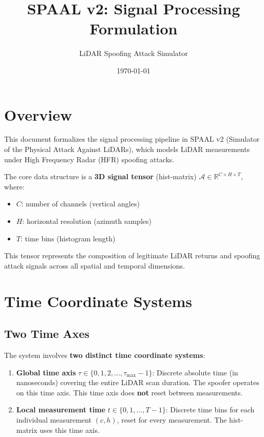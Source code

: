 \documentclass[11pt]{article}
\title{SPAAL v2: Signal Processing Formulation}
\author{LiDAR Spoofing Attack Simulator}
\date{\today}
\begin{document}
\maketitle

\section{Overview}

This document formalizes the signal processing pipeline in SPAAL v2 (Simulator of the Physical Attack Against LiDARs), which models LiDAR measurements under High Frequency Radar (HFR) spoofing attacks.

The core data structure is a \textbf{3D signal tensor} (hist-matrix) $\bm{\mathcal{A}} \in \mathbb{R}^{C \times H \times T}$, where:
\begin{itemize}
    \item $C$: number of channels (vertical angles)
    \item $H$: horizontal resolution (azimuth samples)
    \item $T$: time bins (histogram length)
\end{itemize}

This tensor represents the composition of legitimate LiDAR returns and spoofing attack signals across all spatial and temporal dimensions.

\section{Time Coordinate Systems}

\subsection{Two Time Axes}

The system involves \textbf{two distinct time coordinate systems}:

\begin{enumerate}
    \item \textbf{Global time axis} $\tau \in \{0, 1, 2, \ldots, \tau_{\text{max}}-1\}$: Discrete absolute time (in nanoseconds) covering the entire LiDAR scan duration. The spoofer operates on this time axis. This time axis does \textbf{not} reset between measurements.

    \item \textbf{Local measurement time} $t \in \{0, 1, \ldots, T-1\}$: Discrete time bins for each individual measurement $(c, h)$, reset for every measurement. The hist-matrix uses this time axis.
\end{enumerate}
\end{document}
